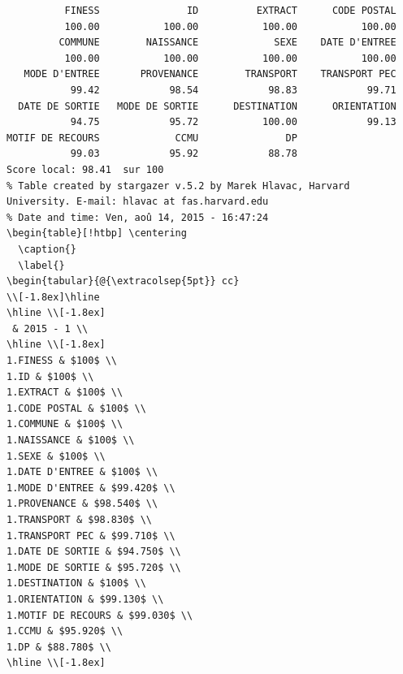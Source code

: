 \documentclass[]{article}
\begin{document}
\begin{verbatim}
          FINESS               ID          EXTRACT      CODE POSTAL 
          100.00           100.00           100.00           100.00 
         COMMUNE        NAISSANCE             SEXE    DATE D'ENTREE 
          100.00           100.00           100.00           100.00 
   MODE D'ENTREE       PROVENANCE        TRANSPORT    TRANSPORT PEC 
           99.42            98.54            98.83            99.71 
  DATE DE SORTIE   MODE DE SORTIE      DESTINATION      ORIENTATION 
           94.75            95.72           100.00            99.13 
MOTIF DE RECOURS             CCMU               DP 
           99.03            95.92            88.78 
Score local: 98.41  sur 100
% Table created by stargazer v.5.2 by Marek Hlavac, Harvard University. E-mail: hlavac at fas.harvard.edu
% Date and time: Ven, aoû 14, 2015 - 16:47:24
\begin{table}[!htbp] \centering 
  \caption{} 
  \label{} 
\begin{tabular}{@{\extracolsep{5pt}} cc} 
\\[-1.8ex]\hline 
\hline \\[-1.8ex] 
 & 2015 - 1 \\ 
\hline \\[-1.8ex] 
1.FINESS & $100$ \\ 
1.ID & $100$ \\ 
1.EXTRACT & $100$ \\ 
1.CODE POSTAL & $100$ \\ 
1.COMMUNE & $100$ \\ 
1.NAISSANCE & $100$ \\ 
1.SEXE & $100$ \\ 
1.DATE D'ENTREE & $100$ \\ 
1.MODE D'ENTREE & $99.420$ \\ 
1.PROVENANCE & $98.540$ \\ 
1.TRANSPORT & $98.830$ \\ 
1.TRANSPORT PEC & $99.710$ \\ 
1.DATE DE SORTIE & $94.750$ \\ 
1.MODE DE SORTIE & $95.720$ \\ 
1.DESTINATION & $100$ \\ 
1.ORIENTATION & $99.130$ \\ 
1.MOTIF DE RECOURS & $99.030$ \\ 
1.CCMU & $95.920$ \\ 
1.DP & $88.780$ \\ 
\hline \\[-1.8ex] 

\end{verbatim}
\end{document}
